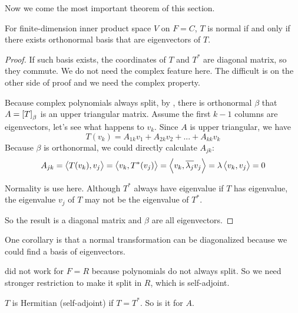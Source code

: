 Now we come the most important theorem of this section.

\begin{theorem}\label{normal_orthonormal_with_complex_space}
    For finite-dimension inner product space $V$ on $F=C$, $T$ is normal if and only if there exists orthonormal basis that are eigenvectors of $T$.
\end{theorem}
\begin{proof}
    If such basis exists, the coordinates of $T$ and $T^*$ are diagonal matrix, so they commute. We do not need the complex feature here. The difficult is on the other side of proof and we need the complex property.
    
    Because complex polynomials always split, by , there is orthonormal $\beta$ that $A=\coordinate{T}_\beta$ is an upper triangular matrix. Assume the first $k-1$ columns are eigenvectors, let's see what happens to $v_{k}$. Since $A$ is upper triangular, we have
    \begin{equation*}
        T(v_k) = A_{1k} v_1 + A_{2k} v_2 + ... + A_{kk} v_k
    \end{equation*}
    Because $\beta$ is orthonormal, we could directly calculate $A_{jk}$:
    \begin{equation*}
        A_{jk} = \left\langle \displaystyle T(v_k), v_j \right\rangle = \left\langle \displaystyle v_k, T^*(v_j) \right\rangle = \left\langle \displaystyle v_k, \overline{\lambda_j} v_j \right\rangle = \lambda \left\langle \displaystyle v_k, v_j \right\rangle = 0
    \end{equation*}
    
    Normality is use here. Although $T^*$ always have eigenvalue if $T$ has eigenvalue, the eigenvalue $v_j$ of $T$ may not be the eigenvalue of $T^*$.
    
    So the result is a diagonal matrix and $\beta$ are all eigenvectors.
\end{proof}

One corollary is that a normal transformation can be diagonalized because we could find a basis  of eigenvectors.

 did not work for $F=R$ because polynomials do not always split. So we need stronger restriction to make it split in $R$, which is self-adjoint.

\begin{definition}
    $T$ is Hermitian (self-adjoint) if $T = T^*$. So is it for $A$.
\end{definition}

